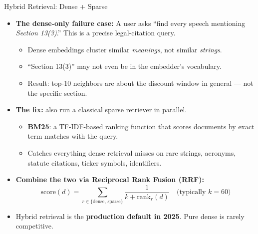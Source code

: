 \begin{frame}{Hybrid Retrieval: Dense + Sparse}
\begin{itemize}
\item \textbf{The dense-only failure case:} A user asks ``find every speech mentioning \emph{Section 13(3)}.'' This is a precise legal-citation query.
\begin{itemize}
    \item Dense embeddings cluster similar \emph{meanings}, not similar \emph{strings}.
    \item ``Section 13(3)'' may not even be in the embedder's vocabulary.
    \item Result: top-10 neighbors are about the discount window in general --- not the specific section.
\end{itemize}

\medskip
\item \textbf{The fix:} also run a classical sparse retriever in parallel.
\begin{itemize}
    \item \textbf{BM25}: a TF-IDF-based ranking function that scores documents by exact term matches with the query.
    \item Catches everything dense retrieval misses on rare strings, acronyms, statute citations, ticker symbols, identifiers.
\end{itemize}

\medskip
\item \textbf{Combine the two via Reciprocal Rank Fusion (RRF):}
\[
\text{score}(d) = \sum_{r \in \{\text{dense, sparse}\}} \frac{1}{k + \text{rank}_r(d)}
\quad \text{(typically } k = 60 \text{)}
\]

\medskip
\item Hybrid retrieval is the \textbf{production default in 2025}. Pure dense is rarely competitive.
\end{itemize}
\end{frame}

